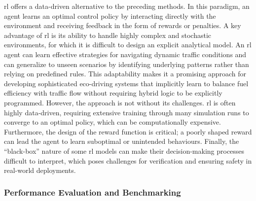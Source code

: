 \mynewline
\ac{rl} offers a data-driven alternative to the preceding methods. In this paradigm, an agent learns an optimal control policy by interacting directly with the environment and receiving feedback in the form of rewards or penalties. A key advantage of \ac{rl} is its ability to handle highly complex and stochastic environments, for which it is difficult to design an explicit analytical model. An \ac{rl} agent can learn effective strategies for navigating dynamic traffic conditions and can generalize to unseen scenarios by identifying underlying patterns rather than relying on predefined rules. This adaptability makes it a promising approach for developing sophisticated eco-driving systems that implicitly learn to balance fuel efficiency with traffic flow without requiring hybrid logic to be explicitly programmed. However, the approach is not without its challenges. \ac{rl} is often highly data-driven, requiring extensive training through many simulation runs to converge to an optimal policy, which can be computationally expensive. Furthermore, the design of the reward function is critical; a poorly shaped reward can lead the agent to learn suboptimal or unintended behaviours. Finally, the \enquote{black-box} nature of some \ac{rl} models can make their decision-making processes difficult to interpret, which poses challenges for verification and ensuring safety in real-world deployments.


\subsubsection{Performance Evaluation and Benchmarking}
\label{subsubsec:performance_evaluation}

